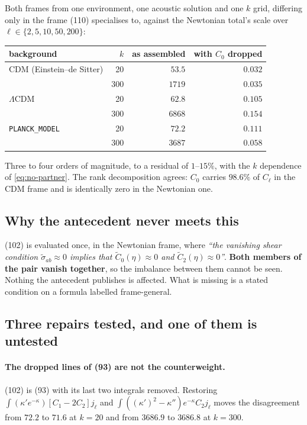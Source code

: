 Both frames from one environment, one acoustic solution and one $k$ grid,
differing only in the frame (110) specialises to, against the Newtonian
total's scale over $\ell\in\{2,5,10,50,200\}$:

\begin{center}
\begin{tabular}{lrrr}
\hline
background & $k$ & as assembled & with $C_0$ dropped \\
\hline
CDM (Einstein--de Sitter) & 20  & $53.5$   & $0.032$ \\
                          & 300 & $1719$   & $0.035$ \\
$\Lambda$CDM              & 20  & $62.8$   & $0.105$ \\
                          & 300 & $6868$   & $0.154$ \\
\texttt{PLANCK\_MODEL}    & 20  & $72.2$   & $0.111$ \\
                          & 300 & $3687$   & $0.058$ \\
\hline
\end{tabular}
\end{center}

\noindent
Three to four orders of magnitude, to a residual of $1$--$15\%$, with the $k$
dependence of \eqref{eq:no-partner}. The rank decomposition agrees: $C_0$
carries $98.6\%$ of $C_\ell$ in the CDM frame and is identically zero in the
Newtonian one.

\subsection{Why the antecedent never meets this}

(102) is evaluated once, in the Newtonian frame, where \emph{``the vanishing
shear condition $\tilde\sigma_{ab}\approx0$ implies that $\tilde
C_0(\eta)\approx0$ and $\tilde C_2(\eta)\approx0$''}. \textbf{Both members of
the pair vanish together}, so the imbalance between them cannot be seen.
Nothing the antecedent publishes is affected. What is missing is a stated
condition on a formula labelled frame-general.

\subsection{Three repairs tested, and one of them is untested}

\paragraph{The dropped lines of (93) are not the counterweight.} (102) is (93)
with its last two integrals removed. Restoring
$\int(\kappa'e^{-\kappa})[C_1-2C_2]j_\ell$ and
$\int((\kappa')^2-\kappa'')e^{-\kappa}C_2j_\ell$ moves the disagreement from
$72.2$ to $71.6$ at $k=20$ and from $3686.9$ to $3686.8$ at $k=300$.

